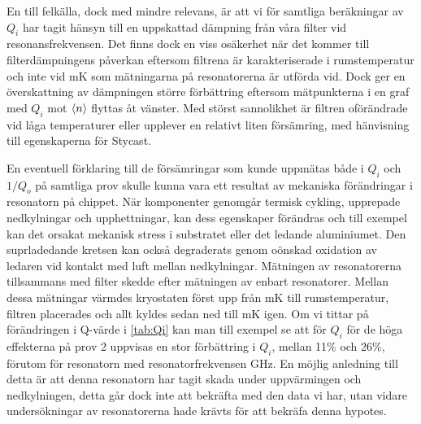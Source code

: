 \documentclass[main.tex]{subfiles}
\begin{document}
En till felkälla, dock med mindre relevans, är att vi för samtliga beräkningar av $Q_i$ har tagit hänsyn till en uppskattad dämpning från våra filter vid resonansfrekvensen. Det finns dock en viss osäkerhet när det kommer till filterdämpningens påverkan eftersom filtrena är karakteriserade i rumstemperatur och inte vid \unit[10]{mK} som mätningarna på resonatorerna är utförda vid. Dock ger en överskattning av dämpningen större förbättring eftersom mätpunkterna i en graf med $Q_i$ mot $\expval{n}$ flyttas åt vänster. Med störst sannolikhet är filtren oförändrade vid låga temperaturer eller upplever en relativt liten försämring, med hänvisning till egenskaperna för Stycast.



En eventuell förklaring till de försämringar som kunde uppmätas både i $Q_i$ och $1/Q_o$ på samtliga prov skulle kunna vara ett resultat av mekaniska förändringar i resonatorn på chippet. När komponenter genomgår termisk cykling, upprepade nedkylningar och upphettningar, kan dess egenskaper förändras och till exempel kan det orsakat mekanisk stress i substratet eller det ledande aluminiumet. Den suprladedande kretsen kan också degraderats genom oönskad oxidation av ledaren vid kontakt med luft mellan nedkylningar. Mätningen av resonatorerna tillsammans med filter skedde efter mätningen av enbart resonatorer. Mellan dessa mätningar värmdes kryostaten först upp från \unit[10]{mK} till rumstemperatur, filtren placerades och allt kyldes sedan ned till \unit[10]{mK} igen. Om vi tittar på förändringen i Q-värde i \ref{tab:Qi} kan man till exempel se att för $Q_i$ för de höga effekterna på prov 2 uppvisas en stor förbättring i $Q_i$, mellan 11\% och 26\%, förutom för resonatorn med resonatorfrekvensen \unit[7,322]{GHz}. En möjlig anledning till detta är att denna resonatorn har tagit skada under uppvärmingen och nedkylningen, detta går dock inte att bekräfta med den data vi har, utan vidare undersökningar av resonatorerna hade krävts för att bekräfa denna hypotes.

\end{document}
